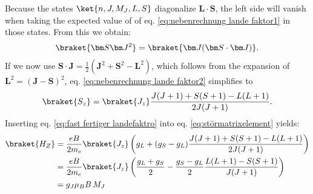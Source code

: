 Because the states $\ket{n,J,M_J,L,S}$ diagonalize $\bm L \cdot \bm S$, the left side  will  vanish when taking the expected value of of eq. \eqref{eq:nebenrechnung lande faktor1} in those states. From this we obtain:
\begin{align}
	\braket{\bm S \bm J^2}=\braket{\bm J(\bm S \cdot \bm J)}\label{eq:nebenrechnung lande faktor2}.
\end{align}
If we now use $\bm S \cdot \bm J=\frac{1}{2}(\bm J^2+\bm S^2-\bm L^2)$, which follows from the expansion of $\bm L^2=(\bm J -\bm S)^2$, eq. \eqref{eq:nebenrechnung lande faktor2} simplifies to
\begin{align}
	\braket{S_z}=\braket{J_z}\frac{J(J+1)+S(S+1)-L(L+1)}{2J(J+1)}. \label{eq:fast fertiger landefaktro}
\end{align}
Inserting eq. \eqref{eq:fast fertiger landefaktro} into eq. \eqref{eq:störmatrixelement} yields:
\begin{align}
	\braket{H_Z}&=\frac{eB}{2m_e}\braket{J_z}\left(g_L+(g_S-g_L)\frac{J(J+1)+S(S+1)-L(L+1)}{2J(J+1)}\right)\nonumber\\
	&=\frac{eB}{2m_e}\braket{J_z}\left(\frac{g_L+g_S}{2}-\frac{g_S-g_L}{2}\frac{L(L+1)-S(S+1)}{J(J+1)}\right)\nonumber\\
	&=g_J\mu_B B \,  M_J \label{eq:energieshift}
\end{align}
